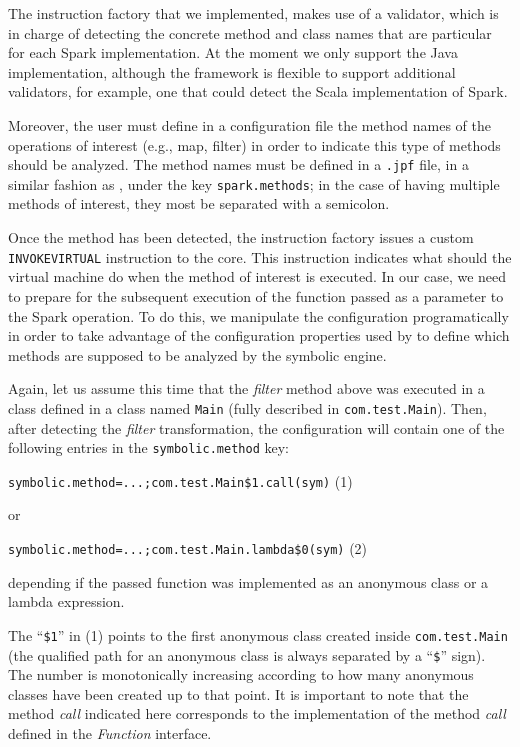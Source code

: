 The instruction factory that we implemented, makes use of a validator, which is in charge of detecting the concrete method and class names that are particular for each Spark implementation. At the moment we only support the Java implementation, although the framework is flexible to support additional validators, for example, one that could detect the Scala implementation of Spark.

Moreover, the user must define in a configuration file the method names of the operations of interest (e.g., map, filter) in order to indicate this type of methods should be analyzed. The method names must be defined in a \texttt{.jpf} file, in a similar fashion as \spf, under the key \texttt{spark.methods}; in the case of having multiple methods of interest, they most be separated with a semicolon.

Once the method has been detected, the instruction factory issues a custom \texttt{INVOKEVIRTUAL} instruction to the \jpf core. This instruction indicates what should the \jpf virtual machine do when the method of interest is executed. In our case, we need to prepare for the subsequent execution of the function passed as a parameter to the Spark operation. To do this, we manipulate the \jpf configuration programatically in order to take advantage of the configuration properties used by \spf to define which methods are supposed to be analyzed by the symbolic engine.

Again, let us assume this time that the \textit{filter} method above was executed in a class defined in a class named \texttt{Main} (fully described in \texttt{com.test.Main}). Then, after detecting the \textit{filter} transformation, the configuration will contain one of the following entries in the \texttt{symbolic.method} key:

\hspace*{1cm} \lstinline[]|symbolic.method=...;com.test.Main$1.call(sym)|  \hfill (1)

or

\hspace*{1cm} \lstinline[]|symbolic.method=...;com.test.Main.lambda$0(sym)| \hfill (2)

depending if the passed function was implemented as an anonymous class or a lambda expression. 

The ``\texttt{\$1}'' in (1) points to the first anonymous class created inside \texttt{com.test.Main} (the qualified path for an anonymous class is always separated by a ``\texttt{\$}'' sign). The number is monotonically increasing according to how many anonymous classes have been created up to that point. It is important to note that the method \textit{call} indicated here corresponds to the implementation of the method \textit{call} defined in the \textit{Function} interface.

